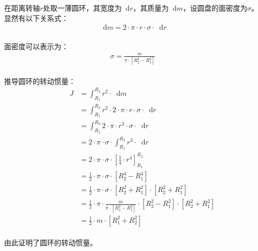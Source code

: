 \documentclass[UTF8]{ctexart}
\newcommand*{\dif}{\mathop{}\!\mathrm{d}}
\begin{document}
    在距离转轴$r$处取一薄圆环，其宽度为$\dif r$，其质量为$\dif m$，设圆盘的面密度为$\sigma$。\\[3mm]
    显然有以下关系式：
    \setcounter{equation}{0}
    \begin{align}
        \dif m=2\cdot\pi\cdot r\cdot\sigma\cdot\dif r
    \end{align}\\
    面密度可以表示为：
    \begin{align}
        \sigma=\frac{m}{\pi\cdot\left[R_2^2-R_1^2\right]}
    \end{align}\\
    推导圆环的转动惯量：
    \begin{align}
        ~~~~~~~~~~~~J
        &=\int_{R_1}^{R_2} r^2\cdot\dif m\\[3mm]
        &=\int_{R_1}^{R_2} r^2\cdot 2\cdot\pi\cdot r\cdot\sigma\cdot\dif r\\[3mm]
        &=\int_{R_1}^{R_2} 2\cdot\pi\cdot r^3\cdot\sigma\cdot\dif r\\[3mm]
        &=2\cdot\pi\cdot\sigma\cdot\int_{R_1}^{R_2}r^3\cdot\dif r\\[3mm]
        &=2\cdot\pi\cdot\sigma\cdot\left[\frac{1}{4}\cdot r^4\right]_{R_1}^{R_2}\\[3mm]
        &=\frac{1}{2}\cdot\pi\cdot\sigma\cdot\left[R_2^4-R_1^4\right]\\[3mm]
        &=\frac{1}{2}\cdot\pi\cdot\sigma\cdot\left[R_2^2+R_1^2\right]\cdot\left[R_2^2+R_1^2\right]\\[3mm]
        &=\frac{1}{2}\cdot\pi\cdot\frac{m}{\pi\cdot\left[R_2^2-R_1^2\right]}\cdot\left[R_2^2-R_1^2\right]\cdot\left[R_2^2+R_1^2\right]\\[3mm]
        &=\frac{1}{2}\cdot m\cdot\left[R_1^2+R_2^2\right]
    \end{align}\\
    由此证明了圆环的转动惯量。

\newpage
\end{document}

